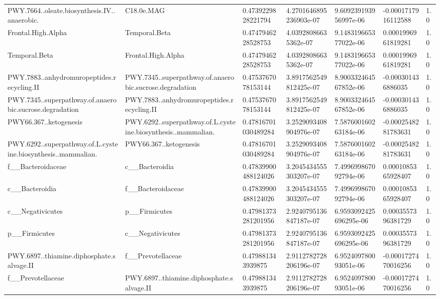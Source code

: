 \begin{longtable}{lllllll}
PWY.7664..oleate.biosynthesis.IV..anaerobic. & C18.0e.MAG & 0.4739229828221794 & 4.2701646895236903e-07 & 9.609239193956997e-06 & -0.0001717916112588 & 1.0 \\
Frontal.High.Alpha & Temporal.Beta & 0.4747946228528753 & 4.03928086635362e-07 & 9.148319665377022e-06 & 0.0001996961819281 & 1.0 \\
Temporal.Beta & Frontal.High.Alpha & 0.4747946228528753 & 4.03928086635362e-07 & 9.148319665377022e-06 & 0.0001996961819281 & 1.0 \\
PWY.7883..anhydromuropeptides.recycling.II & PWY.7345..superpathway.of.anaerobic.sucrose.degradation & 0.4753767078153144 & 3.8917562549812425e-07 & 8.900332464567852e-06 & -0.000301436886035 & 1.0 \\
PWY.7345..superpathway.of.anaerobic.sucrose.degradation & PWY.7883..anhydromuropeptides.recycling.II & 0.4753767078153144 & 3.8917562549812425e-07 & 8.900332464567852e-06 & -0.000301436886035 & 1.0 \\
PWY66.367..ketogenesis & PWY.6292..superpathway.of.L.cysteine.biosynthesis..mammalian. & 0.47816701030489284 & 3.2529093408904976e-07 & 7.587600160263184e-06 & -0.0002548281783631 & 1.0 \\
PWY.6292..superpathway.of.L.cysteine.biosynthesis..mammalian. & PWY66.367..ketogenesis & 0.47816701030489284 & 3.2529093408904976e-07 & 7.587600160263184e-06 & -0.0002548281783631 & 1.0 \\
f\_\_Bacteroidaceae & c\_\_Bacteroidia & 0.47839900488124026 & 3.2045434555303207e-07 & 7.499699867092794e-06 & 0.0001085365928407 & 1.0 \\
c\_\_Bacteroidia & f\_\_Bacteroidaceae & 0.47839900488124026 & 3.2045434555303207e-07 & 7.499699867092794e-06 & 0.0001085365928407 & 1.0 \\
c\_\_Negativicutes & p\_\_Firmicutes & 0.47981373281201956 & 2.9240795136847187e-07 & 6.9593092425696295e-06 & 0.0003557396381729 & 1.0 \\
p\_\_Firmicutes & c\_\_Negativicutes & 0.47981373281201956 & 2.9240795136847187e-07 & 6.9593092425696295e-06 & 0.0003557396381729 & 1.0 \\
PWY.6897..thiamine.diphosphate.salvage.II & f\_\_Prevotellaceae & 0.479881343939875 & 2.9112782728206196e-07 & 6.952409780093051e-06 & -0.0001727470016256 & 1.0 \\
f\_\_Prevotellaceae & PWY.6897..thiamine.diphosphate.salvage.II & 0.479881343939875 & 2.9112782728206196e-07 & 6.952409780093051e-06 & -0.0001727470016256 & 1.0 \\

\end{longtable}
